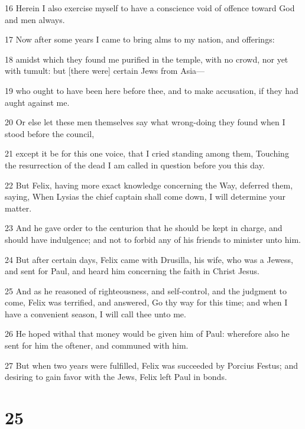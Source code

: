 \par 16 Herein I also exercise myself to have a conscience void of offence toward God and men always.
\par 17 Now after some years I came to bring alms to my nation, and offerings:
\par 18 amidst which they found me purified in the temple, with no crowd, nor yet with tumult: but [there were] certain Jews from Asia—
\par 19 who ought to have been here before thee, and to make accusation, if they had aught against me.
\par 20 Or else let these men themselves say what wrong-doing they found when I stood before the council,
\par 21 except it be for this one voice, that I cried standing among them, Touching the resurrection of the dead I am called in question before you this day.
\par 22 But Felix, having more exact knowledge concerning the Way, deferred them, saying, When Lysias the chief captain shall come down, I will determine your matter.
\par 23 And he gave order to the centurion that he should be kept in charge, and should have indulgence; and not to forbid any of his friends to minister unto him.
\par 24 But after certain days, Felix came with Drusilla, his wife, who was a Jewess, and sent for Paul, and heard him concerning the faith in Christ Jesus.
\par 25 And as he reasoned of righteousness, and self-control, and the judgment to come, Felix was terrified, and answered, Go thy way for this time; and when I have a convenient season, I will call thee unto me.
\par 26 He hoped withal that money would be given him of Paul: wherefore also he sent for him the oftener, and communed with him.
\par 27 But when two years were fulfilled, Felix was succeeded by Porcius Festus; and desiring to gain favor with the Jews, Felix left Paul in bonds.

\chapter{25}

